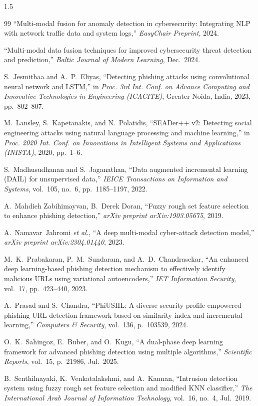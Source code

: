 \documentclass[a4paper, 14pt, oneside]{Thesis}
\begin{document}
{\begin{spacing}{1.5}
\begin{thebibliography}{99}
``Multi-modal fusion for anomaly detection in cybersecurity: Integrating NLP with network traffic data and system logs,'' \textit{EasyChair Preprint}, 2024.

``Multi-modal data fusion techniques for improved cybersecurity threat detection and prediction,'' \textit{Baltic Journal of Modern Learning}, Dec.~2024.

S.~Jesmithaa and A.~P.~Eliyas, ``Detecting phishing attacks using convolutional neural network and LSTM,'' in \textit{Proc. 3rd Int. Conf. on Advance Computing and Innovative Technologies in Engineering (ICACITE)}, Greater Noida, India, 2023, pp.~802--807.

M.~Lansley, S.~Kapetanakis, and N.~Polatidis, ``SEADer++ v2: Detecting social engineering attacks using natural language processing and machine learning,'' in \textit{Proc. 2020 Int. Conf. on Innovations in Intelligent Systems and Applications (INISTA)}, 2020, pp.~1--6.

S.~Madhusudhanan and S.~Jaganathan, ``Data augmented incremental learning (DAIL) for unsupervised data,'' \textit{IEICE Transactions on Information and Systems}, vol.~105, no.~6, pp.~1185--1197, 2022.

A.~Mahdieh Zabihimayvan, B.~Derek Doran, 
``Fuzzy rough set feature selection to enhance phishing detection,'' 
\textit{arXiv preprint arXiv:1903.05675}, 2019.

A.~Namavar~Jahromi \textit{et al.}, ``A deep multi-modal cyber-attack detection model,'' \textit{arXiv preprint arXiv:2304.01440}, 2023.

M.~K.~Prabakaran, P.~M.~Sundaram, and A.~D.~Chandrasekar, ``An enhanced deep learning-based phishing detection mechanism to effectively identify malicious URLs using variational autoencoders,'' \textit{IET Information Security}, vol.~17, pp.~423--440, 2023.

A.~Prasad and S.~Chandra, ``PhiUSIIL: A diverse security profile empowered phishing URL detection framework based on similarity index and incremental learning,'' \textit{Computers \& Security}, vol.~136, p.~103539, 2024.

O.~K.~Sahingoz, E.~Buber, and O.~Kugu, ``A dual-phase deep learning framework for advanced phishing detection using multiple algorithms,'' \textit{Scientific Reports}, vol.~15, p.~21986, Jul.~2025.

B.~Senthilnayaki, K.~Venkatalakshmi, and A.~Kannan, 
``Intrusion detection system using fuzzy rough set feature selection and modified KNN classifier,'' 
\textit{The International Arab Journal of Information Technology}, 
vol.~16, no.~4, Jul.~2019.


\end{thebibliography}
\end{spacing}}
\end{document}
